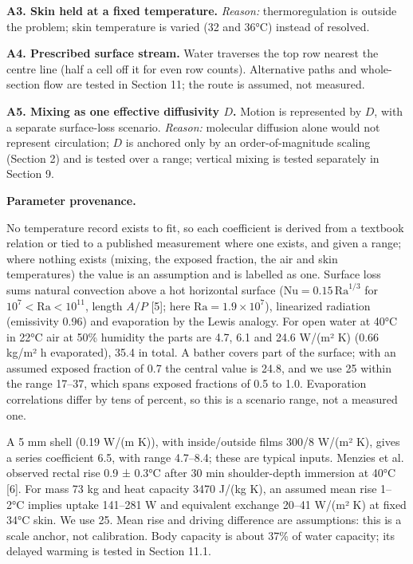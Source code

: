 \documentclass[12pt,a4paper]{article}
\begin{document}
\textbf{A3. Skin held at a fixed temperature.} \emph{Reason:} thermoregulation is outside the problem; skin temperature is varied (32 and 36°C) instead of resolved.

\textbf{A4. Prescribed surface stream.} Water traverses the top row nearest the centre line (half a cell off it for even row counts). Alternative paths and whole-section flow are tested in Section 11; the route is assumed, not measured.

\textbf{A5. Mixing as one effective diffusivity $D$.} Motion is represented by $D$, with a separate surface-loss scenario. \emph{Reason:} molecular diffusion alone would not represent circulation; $D$ is anchored only by an order-of-magnitude scaling (Section 2) and is tested over a range; vertical mixing is tested separately in Section 9.

\textbf{Parameter provenance.}

No temperature record exists to fit, so each coefficient is derived from a textbook relation or tied to a published measurement where one exists, and given a range; where nothing exists (mixing, the exposed fraction, the air and skin temperatures) the value is an assumption and is labelled as one. Surface loss sums natural convection above a hot horizontal surface ($\mathrm{Nu}=0.15\,\mathrm{Ra}^{1/3}$ for $10^{7}<\mathrm{Ra}<10^{11}$, length $A/P$ [5]; here $\mathrm{Ra}=1.9\times10^{7}$), linearized radiation (emissivity 0.96) and evaporation by the Lewis analogy. For open water at 40°C in 22°C air at 50\% humidity the parts are 4.7, 6.1 and 24.6 W/(m² K) (0.66 kg/m² h evaporated), 35.4 in total. A bather covers part of the surface; with an assumed exposed fraction of 0.7 the central value is 24.8, and we use 25 within the range 17–37, which spans exposed fractions of 0.5 to 1.0. Evaporation correlations differ by tens of percent, so this is a scenario range, not a measured one.

A 5 mm shell (0.19 W/(m K)), with inside/outside films 300/8 W/(m² K), gives a series coefficient 6.5, with range 4.7–8.4; these are typical inputs. Menzies et al. observed rectal rise 0.9 ± 0.3°C after 30 min shoulder-depth immersion at 40°C [6]. For mass 73 kg and heat capacity 3470 J/(kg K), an assumed mean rise 1–2°C implies uptake 141–281 W and equivalent exchange 20–41 W/(m² K) at fixed 34°C skin. We use 25. Mean rise and driving difference are assumptions: this is a scale anchor, not calibration. Body capacity is about 37\% of water capacity; its delayed warming is tested in Section 11.1.
\end{document}
